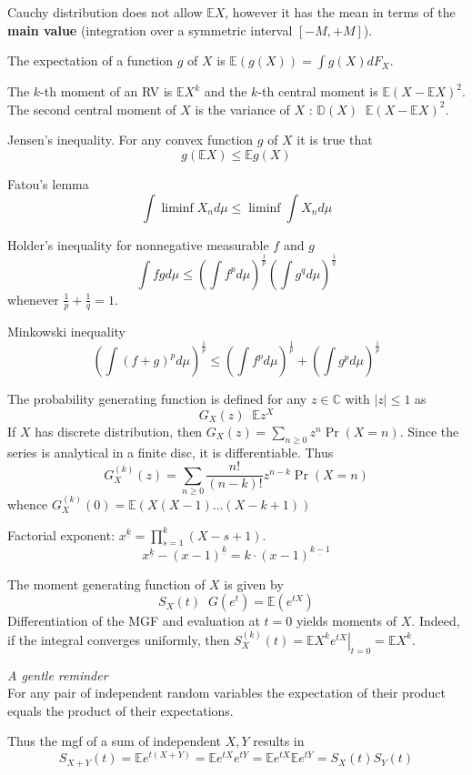 \documentclass[a4paper]{article}
\newcommand{\clo}[1]{{\left [ #1 \right ]}}
\newcommand{\brac}[1]{{\left ( #1 \right )}}
\newcommand{\induc}[1]{{\left . #1 \right \vert}}
\newcommand{\abs}[1]{{\left | #1 \right |}}
\newcommand{\Cplx}{\mathbb{C}}
\newcommand{\ex}{\mathbb{E}}
\newcommand{\defn}{\mathop{\overset{\Delta}{=}}\nolimits}
\newcommand{\rus}[1]{\foreignlanguage{russian}{#1}}
\begin{document}
Cauchy distribution does not allow $\ex X$, however it has the mean in terms of the \textbf{main value} (integration over a symmetric interval $\clo{-M,+M}$).

The expectation of a function $g$ of $X$ is $\ex\brac{g(X)} = \int g(X) dF_X$.

The $k$-th moment of an RV is $\ex X^k$ and the $k$-th central moment is $\ex\brac{ X - \ex X}^2$.
The second central moment of $X$ is the variance of $X$ : $\mathbb{D}(X) \defn \ex\brac{ X - \ex X}^2$.

Jensen's inequality. For any convex function $g$ of $X$ it is true that 
\[g\brac{\ex X}\leq \ex g(X) \]

Fatou's lemma \[\int \liminf X_n d\mu \leq \liminf \int X_n d\mu\]

Holder's inequality for nonnegative measurable $f$ and $g$ \[\int fg d\mu \leq \brac{\int f^p d\mu}^\frac{1}{p}\brac{\int g^q d\mu}^\frac{1}{q}\] whenever $\frac{1}{p}+\frac{1}{q}=1$.

Minkowski inequality \[\brac{\int {(f+g)}^p d\mu}^\frac{1}{p}\leq \brac{\int f^p d\mu}^\frac{1}{p} + \brac{\int g^p d\mu}^\frac{1}{p}\]

The probability generating function is defined for any $z\in \Cplx$ with $\abs{z}\leq 1$ as \[G_X(z) \defn \ex z^X\]
If $X$ has discrete distribution, then $G_X(z) = \sum_{n\geq 0} z^n \Pr(X=n)$.
Since the series is analytical in a finite disc, it is differentiable.
Thus \[G_X^{(k)}(z) = \sum_{n\geq 0} \frac{n!}{(n-k)!} z^{n-k} \Pr(X=n) \]
whence $G_X^{(k)}(0) = \ex \brac{X(X-1)\ldots (X-k+1)}$

Factorial exponent: $x^{\underline{k}} = \prod_{s=1}^k (X-s+1)$.
\[x^{\underline{k}} - \brac{x-1}^{\underline{k}} = k \cdot \brac{x-1}^{\underline{k-1}} \]

The moment generating function of $X$ is given by \[S_X(t) \defn G(e^t) = \ex(e^{tX})\]
Differentiation of the MGF and evaluation at $t=0$ yields moments of $X$.
Indeed, if the integral converges uniformly, then $S_X^{(k)}(t) = \induc{\ex X^k e^{tX}}_{t=0} = \ex X^k$.

\emph{A gentle reminder}\hfill \\
For any pair of independent random variables the expectation of their product equals the product of their expectations.

Thus the mgf of a sum of independent $X,Y$ results in \[S_{X+Y}(t) = \ex e^{t(X+Y)} = \ex e^{tX} e^{tY} = \ex e^{tX} \ex e^{tY} = S_X(t) S_Y(t)\]
\end{document}
